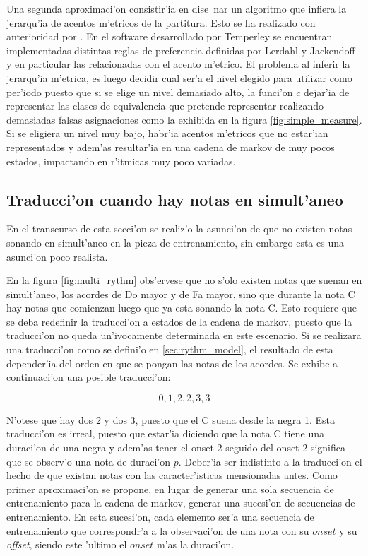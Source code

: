 Una segunda aproximaci'on consistir'ia en dise~nar un algoritmo que infiera la jerarqu'ia de acentos m'etricos de la partitura. Esto se ha realizado con anterioridad por
\cite{Temperley2001}. En el software desarrollado por Temperley se encuentran implementadas distintas reglas de preferencia definidas por Lerdahl y 
Jackendoff y en particular las relacionadas con el acento m'etrico. El problema al inferir la jerarqu'ia m'etrica, es luego decidir cual ser'a el 
nivel elegido para utilizar como per'iodo puesto que si se elige un nivel demasiado alto, la funci'on $c$ dejar'ia de representar las clases de 
equivalencia que pretende representar realizando demasiadas falsas asignaciones como la exhibida en la figura \ref{fig:simple_measure}. Si 
se eligiera un nivel muy bajo, habr'ia acentos m'etricos que no estar'ian representados y adem'as resultar'ia en una cadena de markov de muy pocos estados,
impactando en r'itmicas muy poco variadas.


\subsection{Traducci'on cuando hay notas en simult'aneo}
En el transcurso de esta secci'on se realiz'o la asunci'on de que no existen notas sonando en simult'aneo en la pieza de entrenamiento, sin embargo esta es una asunci'on poco
realista.


\begin{imagen}
\end{imagen}

En la figura \ref{fig:multi_rythm} obs'ervese que no s'olo existen notas que suenan en simult'aneo, los acordes de Do mayor y de Fa mayor, 
sino que durante la nota C hay notas que comienzan luego que ya esta sonando la nota C. Esto requiere que se deba redefinir la traducci'on
a estados de la cadena de markov, puesto que la traducci'on no queda un'ivocamente determinada en este escenario.
Si se realizara una traducci'on como se defini'o en \ref{sec:rythm_model}, el resultado de esta depender'ia del orden en que se pongan
las notas de los acordes. Se exhibe a continuaci'on una posible traducci'on:

$$0, 1, 2, 2, 3, 3$$

N'otese que hay dos 2 y dos 3, puesto que el C suena desde la negra 1. Esta traducci'on es irreal, puesto que estar'ia diciendo que la nota C tiene
una duraci'on de una negra y adem'as tener el onset 2 seguido del onset 2 significa que se observ'o una nota de duraci'on $p$. 
Deber'ia ser indistinto a la traducci'on el hecho de que existan notas 
con las caracter'isticas mensionadas antes. Como primer aproximaci'on se propone, en lugar de generar una sola secuencia de entrenamiento para la cadena
de markov, generar una sucesi'on de secuencias de entrenamiento. En esta sucesi'on, cada elemento ser'a una secuencia de entrenamiento
que correspondr'a a la observaci'on de una nota con su $onset$ y su \emph{offset}, siendo este 'ultimo el $onset$ m'as la duraci'on. 

